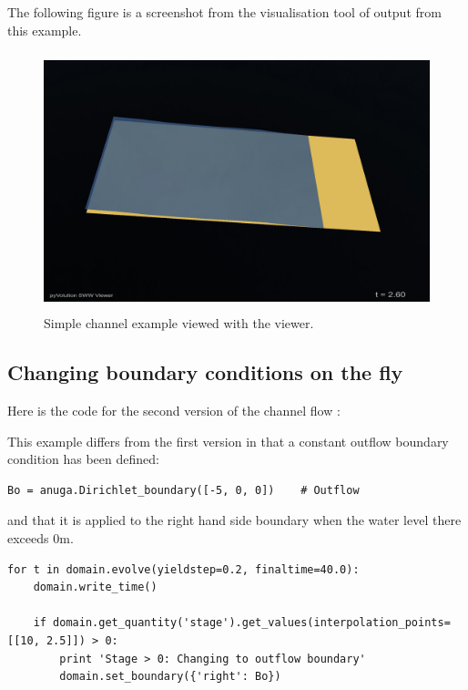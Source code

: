 \documentclass{manual}
\begin{document}
The following figure is a screenshot from the \anuga visualisation
tool  of output from this example.

\begin{figure}[htp]
  \centerline{\includegraphics[height=75mm]
    {graphics/channel1.png}}%
  \caption{Simple channel example viewed with the \anuga viewer.}
  \label{fig:channel1}
\end{figure}

\subsection{Changing boundary conditions on the fly}
\label{sec:change boundary}

Here is the code for the second version of the channel flow :



This example differs from the first version in that a constant outflow boundary condition has
been defined:

\begin{verbatim}
Bo = anuga.Dirichlet_boundary([-5, 0, 0])    # Outflow
\end{verbatim}

and that it is applied to the right hand side boundary when the water level there exceeds 0m.

\begin{verbatim}
for t in domain.evolve(yieldstep=0.2, finaltime=40.0):
    domain.write_time()

    if domain.get_quantity('stage').get_values(interpolation_points=[[10, 2.5]]) > 0:
        print 'Stage > 0: Changing to outflow boundary'
        domain.set_boundary({'right': Bo})
\end{verbatim}
\end{document}
